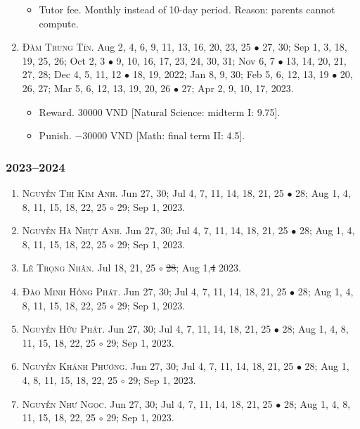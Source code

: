 \documentclass{article}
\begin{document}
\begin{enumerate}
	\begin{itemize}
		\item {\sf Tutor fee.} Monthly instead of 10-day period. Reason: parents cannot compute.
	\end{itemize}
	\item \textsc{Đàm Trung Tín.} {\sf[In]} Aug 2, 4, 6, 9, 11, 13, 16, 20, 23, 25 $\bullet$ 27, 30; Sep 1, 3, 18, 19, 25, 26; Oct 2, 3 $\bullet$ 9, 10, 16, 17, 23, 24, 30, 31; Nov 6, 7 $\bullet$ 13, 14, 20, 21, 27, 28; Dec 4, 5, 11, 12 $\bullet$ 18, 19, 2022; Jan 8, 9, 30; Feb 5, 6, 12, 13, 19 $\bullet$ 20, 26, 27; Mar 5, 6, 12, 13, 19, 20, 26 $\bullet$ 27; Apr 2, 9, 10, 17, 2023. {\sf[Out]}
	\begin{itemize}
		\item {\sf Reward.} 30000 VND [Natural Science: midterm I: 9.75].
		\item {\sf Punish.} $-30000$ VND [Math: final term II: 4.5].
	\end{itemize}
\end{enumerate}

\subsubsection{2023--2024}
 
\begin{enumerate}
	\item \textsc{Nguyễn Thị Kim Anh.} {\sf[In]} Jun 27, 30; Jul 4, 7, 11, 14, 18, 21, 25 $\bullet$ 28; Aug 1, 4, 8, 11, 15, 18, 22, 25 $\circ$ 29; Sep 1, 2023.
	\item \textsc{Nguyễn Hà Nhựt Anh.} {\sf[In]} Jun 27, 30; Jul 4, 7, 11, 14, 18, 21, 25 $\bullet$ 28; Aug 1, 4, 8, 11, 15, 18, 22, 25 $\circ$ 29; Sep 1, 2023.
	\item \textsc{Lê Trọng Nhân.} {\sf[In]} Jul 18, 21, 25 $\circ$ \st{28}; Aug 1,\st{4} \sf{[Out]} 2023.
	\item \textsc{Đào Minh Hồng Phát.} {\sf[In]} Jun 27, 30; Jul 4, 7, 11, 14, 18, 21, 25 $\bullet$ 28; Aug 1, 4, 8, 11, 15, 18, 22, 25 $\circ$ 29; Sep 1, 2023.
	\item \textsc{Nguyễn Hữu Phát.} {\sf[In]} Jun 27, 30; Jul 4, 7, 11, 14, 18, 21, 25 $\bullet$ 28; Aug 1, 4, 8, 11, 15, 18, 22, 25 $\circ$ 29; Sep 1, 2023.	
	\item \textsc{Nguyễn Khánh Phương.} {\sf[In]} Jun 27, 30; Jul 4, 7, 11, 14, 18, 21, 25 $\bullet$ 28; Aug 1, 4, 8, 11, 15, 18, 22, 25 $\circ$ 29; Sep 1, 2023.
	\item \textsc{Nguyễn Như Ngọc.} {\sf[In]} Jun 27, 30; Jul 4, 7, 11, 14, 18, 21, 25 $\bullet$ 28; Aug 1, 4, 8, 11, 15, 18, 22, 25 $\circ$ 29; Sep 1, 2023.
\end{enumerate}
\end{document}
